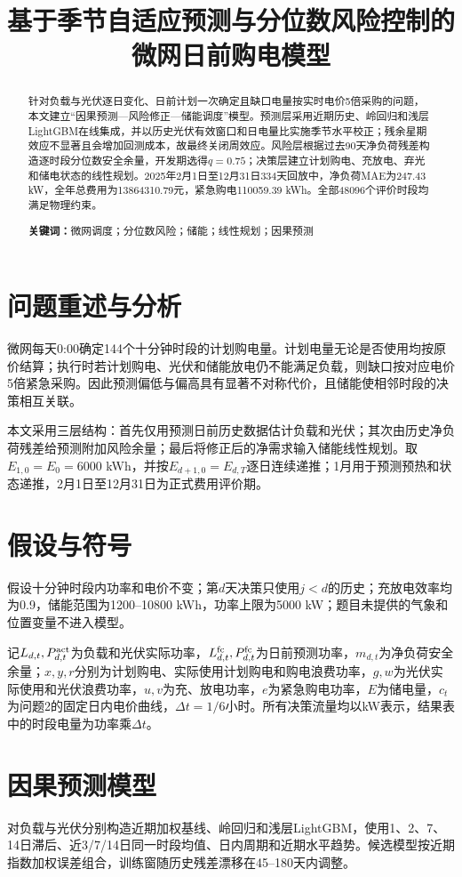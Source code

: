 \documentclass[UTF8,12pt]{ctexart}
\title{基于季节自适应预测与分位数风险控制的微网日前购电模型}
\author{}
\date{}
\begin{document}
\maketitle

\begin{abstract}
针对负载与光伏逐日变化、日前计划一次确定且缺口电量按实时电价5倍采购的问题，本文建立“因果预测—风险修正—储能调度”模型。预测层采用近期历史、岭回归和浅层LightGBM在线集成，并以历史光伏有效窗口和日电量比实施季节水平校正；残余星期效应不显著且会增加回测成本，故最终关闭周效应。风险层根据过去90天净负荷残差构造逐时段分位数安全余量，开发期选得$q=0.75$；决策层建立计划购电、充放电、弃光和储电状态的线性规划。2025年2月1日至12月31日334天回放中，净负荷MAE为247.43 kW，全年总费用为13864310.79元，紧急购电110059.39 kWh。全部48096个评价时段均满足物理约束。

\textbf{关键词：}微网调度；分位数风险；储能；线性规划；因果预测
\end{abstract}

\section{问题重述与分析}
微网每天0:00确定144个十分钟时段的计划购电量。计划电量无论是否使用均按原价结算；执行时若计划购电、光伏和储能放电仍不能满足负载，则缺口按对应电价5倍紧急采购。因此预测偏低与偏高具有显著不对称代价，且储能使相邻时段的决策相互关联。

本文采用三层结构：首先仅用预测日前历史数据估计负载和光伏；其次由历史净负荷残差给预测附加风险余量；最后将修正后的净需求输入储能线性规划。取$E_{1,0}=E_0=6000$ kWh，并按$E_{d+1,0}=E_{d,T}$逐日连续递推；1月用于预测预热和状态递推，2月1日至12月31日为正式费用评价期。

\section{假设与符号}
假设十分钟时段内功率和电价不变；第$d$天决策只使用$j<d$的历史；充放电效率均为0.9，储能范围为1200--10800 kWh，功率上限为5000 kW；题目未提供的气象和位置变量不进入模型。

记$L_{d,t},P_{d,t}^{\rm act}$为负载和光伏实际功率，$L_{d,t}^{\rm fc},P_{d,t}^{\rm fc}$为日前预测功率，$m_{d,t}$为净负荷安全余量；$x,y,r$分别为计划购电、实际使用计划购电和购电浪费功率，$g,w$为光伏实际使用和光伏浪费功率，$u,v$为充、放电功率，$e$为紧急购电功率，$E$为储电量，$c_t$为问题2的固定日内电价曲线，$\Delta t=1/6$小时。所有决策流量均以kW表示，结果表中的时段电量为功率乘$\Delta t$。

\section{因果预测模型}
对负载与光伏分别构造近期加权基线、岭回归和浅层LightGBM，使用1、2、7、14日滞后、近3/7/14日同一时段均值、日内周期和近期水平趋势。候选模型按近期指数加权误差组合，训练窗随历史残差漂移在45--180天内调整。
\end{document}
